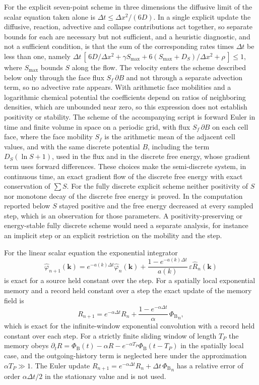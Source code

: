 \documentclass[11pt]{article}
\theoremstyle{definition}
\theoremstyle{remark}
\newcommand{\kk}{\mathbf{k}}
\newcommand{\Phib}{{\Phi_{\mathrm{B}}}}
\begin{document}
For the explicit seven-point scheme in three dimensions the diffusive limit of the scalar equation taken alone is $\Delta t\le\Delta x^2/(6D)$. In a single explicit update the diffusive, reaction, advective and collapse contributions act together, so separate bounds for each are necessary but not sufficient, and a heuristic diagnostic, and not a sufficient condition, is that the sum of the corresponding rates times $\Delta t$ be less than one, namely $\Delta t\,[\,6D/\Delta x^2+\gamma S_{\max}+6(S_{\max}+D_S)/\Delta x^2+\rho\,]\le1$, where $S_{\max}$ bounds $S$ along the flow. The velocity enters the scheme described below only through the face flux $S_f\,\partial B$ and not through a separate advection term, so no advective rate appears. With arithmetic face mobilities and a logarithmic chemical potential the coefficients depend on ratios of neighboring densities, which are unbounded near zero, so this expression does not establish positivity or stability. The scheme of the accompanying script is forward Euler in time and finite volume in space on a periodic grid, with flux $S_f\,\partial B$ on each cell face, where the face mobility $S_f$ is the arithmetic mean of the adjacent cell values, and with the same discrete potential $B$, including the term $D_S(\ln S+1)$, used in the flux and in the discrete free energy, whose gradient term uses forward differences. These choices make the semi-discrete system, in continuous time, an exact gradient flow of the discrete free energy with exact conservation of $\sum S$. For the fully discrete explicit scheme neither positivity of $S$ nor monotone decay of the discrete free energy is proved. In the computation reported below $S$ stayed positive and the free energy decreased at every sampled step, which is an observation for those parameters. A positivity-preserving or energy-stable fully discrete scheme would need a separate analysis, for instance an implicit step or an explicit restriction on the mobility and the step.

For the linear scalar equation the exponential integrator
\begin{equation}
\hat\varphi_{n+1}(\kk)=e^{-a(k)\Delta t}\hat\varphi_n(\kk)+\frac{1-e^{-a(k)\Delta t}}{a(k)}\,\varepsilon\hat R_n(\kk)
\end{equation}
is exact for a source held constant over the step. For a spatially local exponential memory and a record held constant over a step the exact update of the memory field is
\begin{equation}
R_{n+1}=e^{-\alpha\Delta t}R_n+\frac{1-e^{-\alpha\Delta t}}{\alpha}\,\Phib_n,
\end{equation}
which is exact for the infinite-window exponential convolution with a record held constant over each step. For a strictly finite sliding window of length $T_P$ the memory obeys $\partial_tR=\Phib(t)-\alpha R-e^{-\alpha T_P}\Phib(t-T_P)$ in the spatially local case, and the outgoing-history term is neglected here under the approximation $\alpha T_P\gg1$. The Euler update $R_{n+1}=e^{-\alpha\Delta t}R_n+\Delta t\,\Phib_n$ has a relative error of order $\alpha\Delta t/2$ in the stationary value and is not used.
\end{document}
